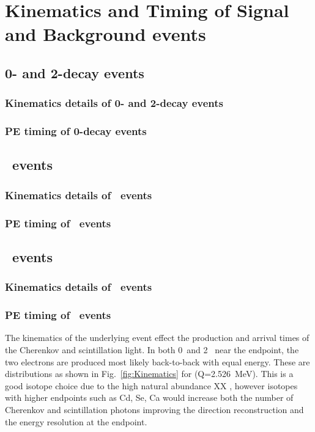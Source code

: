 \section{Kinematics and Timing of Signal and Background events}


\subsection{0\nbb- and 2\nbb-decay events}
\subsubsection{Kinematics details of 0\nbb- and 2\nbb-decay events}
\subsubsection{PE timing of 0\nbb-decay events}

\subsection{\B~events}
\subsubsection{Kinematics details of \B~events}
\subsubsection{PE timing of \B~events}

\subsection{\C~events}
\subsubsection{Kinematics details of \C~events}
\subsubsection{PE timing of \C~events}







The kinematics of the underlying event effect the production and arrival times of the Cherenkov and scintillation light. In both 0\nbb~and 2\nbb~ near the endpoint, the two electrons are produced most likely back-to-back with equal energy. These are distributions as shown in Fig.~\ref{fig:Kinematics} for \Te(Q=2.526~MeV). This is a good isotope choice due to the high natural abundance XX , however isotopes with higher endpoints such as Cd, Se, Ca would increase both the number of Cherenkov and scintillation photons improving the direction reconstruction and the energy resolution at the endpoint.


